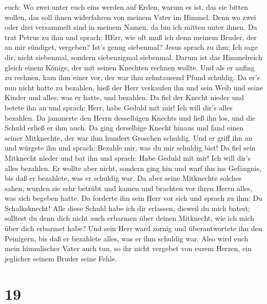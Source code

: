 euch: Wo zwei unter euch eins werden auf Erden, warum es ist, das sie
bitten wollen, das soll ihnen widerfahren von meinem Vater im Himmel.
 Denn wo zwei oder drei versammelt sind in meinem Namen, da
bin ich mitten unter ihnen.  Da trat Petrus zu ihm und
sprach: HErr, wie oft muß ich denn meinem Bruder, der an mir sündiget,
vergeben? Ist's genug siebenmal?  Jesus sprach zu ihm: Ich
sage dir, nicht siebenmal, sondern siebenzigmal siebenmal. 
Darum ist das Himmelreich gleich einem Könige, der mit seinen Knechten
rechnen wollte.  Und als er anfing zu rechnen, kam ihm
einer vor, der war ihm zehntausend Pfund schuldig.  Da er's
nun nicht hatte zu bezahlen, hieß der Herr verkaufen ihn und sein Weib
und seine Kinder und alles, was er hatte, und bezahlen.  Da
fiel der Knecht nieder und betete ihn an und sprach: Herr, habe Geduld
mit mir! Ich will dir's alles bezahlen.  Da jammerte den
Herrn desselbigen Knechts und ließ ihn los, und die Schuld erließ er ihm
auch.  Da ging derselbige Knecht hinaus und fand einen
seiner Mitknechte, der war ihm hundert Groschen schuldig. Und er griff
ihn an und würgete ihn und sprach: Bezahle mir, was du mir schuldig
bist!  Da fiel sein Mitknecht nieder und bat ihn und
sprach: Habe Geduld mit mir! Ich will dir's alles bezahlen.
 Er wollte aber nicht, sondern ging hin und warf ihn ins
Gefängnis, bis daß er bezahlete, was er schuldig war.  Da
aber seine Mitknechte solches sahen, wurden sie sehr betrübt und kamen
und brachten vor ihren Herrn alles, was sich begeben hatte.
 Da forderte ihn sein Herr vor sich und sprach zu ihm: Du
Schalksknecht! Alle diese Schuld habe ich dir erlassen, dieweil du mich
batest;  solltest du denn dich nicht auch erbarmen über
deinen Mitknecht, wie ich mich über dich erbarmet habe? 
Und sein Herr ward zornig und überantwortete ihn den Peinigern, bis daß
er bezahlete alles, was er ihm schuldig war.  Also wird
euch mein himmlischer Vater auch tun, so ihr nicht vergebet von eurem
Herzen, ein jeglicher seinem Bruder seine Fehle.

\hypertarget{section-18}{%
\section{19}\label{section-18}}

